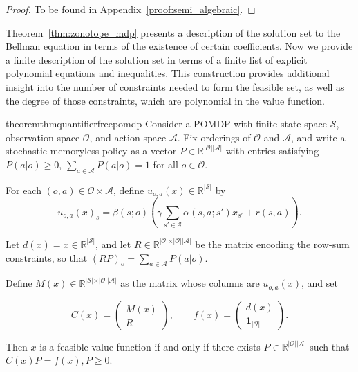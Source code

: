 \documentclass{article}
\theoremstyle{definition}
\theoremstyle{remark}
\begin{document}
\begin{proof}
    To be found in Appendix~\ref{proof:semi_algebraic}. 
\end{proof}

Theorem~\ref{thm:zonotope_mdp} presents a description of the solution set to the Bellman equation in terms of the existence of certain coefficients. 
%
Now we provide a finite description of the solution set in terms of a finite list of explicit polynomial equations and inequalities. 
%
This construction provides additional insight into the number of constraints needed to form the feasible set, as well as the degree of those constraints, which are polynomial in the value function.  

\begin{restatable}{theorem}{thmquantifierfreepomdp}
\label{thm:quantifier_free_pomdp}
\label{thm:determinant-bellman-equation}
Consider a POMDP with finite state space $\mathcal S$, observation space $\mathcal O$, and action space $\mathcal A$. Fix orderings of $\mathcal O$ and $\mathcal A$, and write a stochastic memoryless policy as a vector $P\in\mathbb R^{\vert \mathcal O\vert \vert \mathcal A\vert }$ with entries satisfying $P(a| o)\ge 0$, $\sum_{a\in\mathcal A}P(a | o)=1$ for all $o\in\mathcal O$.

For each $(o,a)\in\mathcal O\times\mathcal A$, define $u_{o,a}(x)\in\mathbb R^{\vert \mathcal S\vert }$ by 
\[
u_{o,a}(x)_s = \beta(s;o) \left(\gamma\sum_{s'\in\mathcal S}\alpha(s,a;s')x_{s'}+ r(s,a) \right).
\]

Let $d(x)=x\in\mathbb R^{\vert \mathcal S\vert }$, and let $R\in\mathbb R^{\vert \mathcal O\vert \times \vert \mathcal O\vert \vert \mathcal A\vert }$ be the matrix encoding the row-sum constraints, so that  $(RP)_o=\sum_{a\in\mathcal A}P(a |  o)$.

Define $M(x) \in \mathbb R^{\vert \mathcal S\vert \times \vert \mathcal O\vert \vert \mathcal A\vert }$ as the matrix whose columns are $u_{o,a}(x)$, and set

\[
C(x) = \begin{pmatrix} M(x)\\ R \end{pmatrix},
\qquad
f(x) = \begin{pmatrix} d(x)\\ \mathbf 1_{\vert \mathcal O\vert } 
\end{pmatrix}.
\]

Then $x$ is a feasible value function if and only if there exists $P\in\mathbb R^{\vert \mathcal O\vert \vert \mathcal A\vert }$ such that $C(x)P=f(x), P\ge 0$.


\end{restatable}
\end{document}

